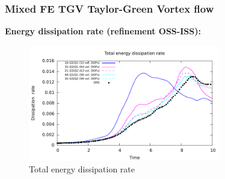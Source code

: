 \begin{frame}
 \frametitle{Mixed FE TGV {\small Taylor-Green Vortex flow}}
 \textbf{Energy dissipation rate (refinement OSS-ISS):}
 \vspace*{-0.1cm}
   \begin{figure}
     \centering	
     \includegraphics[width=0.75\textwidth]{Figures/TGV_OSS_ISS_refinement_tot.pdf}
     \vspace*{-0.3cm}
     \caption{Total energy dissipation rate}
   \end{figure}
 \begin{overlayarea}{\textwidth}{1.5cm}
  \end{overlayarea}
\end{frame}
